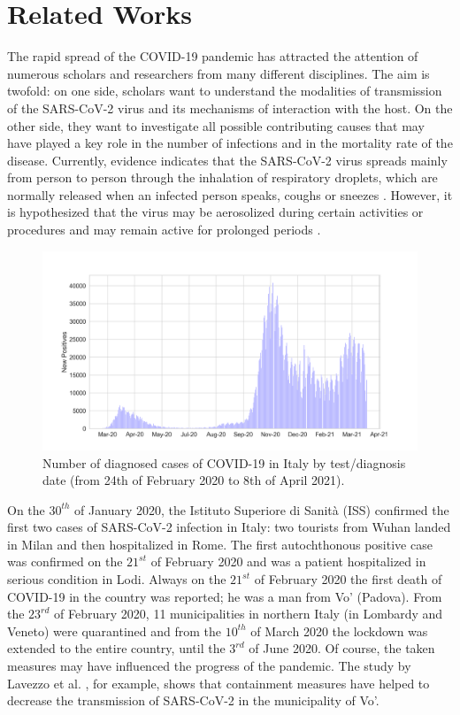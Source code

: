 \documentclass[review]{elsarticle}
\begin{document}
\section{Related Works}
The rapid spread of the COVID-19 pandemic has attracted the attention of numerous scholars and researchers from many different disciplines. The aim is twofold: on one side, scholars want to understand the modalities of transmission of the SARS-CoV-2 virus and its mechanisms of interaction with the host. On the other side, they want to investigate all possible contributing causes that may have played a key role in the number of infections and in the mortality rate of the disease. Currently, evidence indicates that the SARS-CoV-2 virus spreads mainly from person to person through the inhalation of respiratory droplets, which are normally released when an infected person speaks, coughs or sneezes \cite{la2020coronavirus}. However, it is hypothesized that the virus may be aerosolized during certain activities or procedures and may remain active for prolonged periods \cite{van2020aerosol}.
%
\begin{figure}
	\centering
	\includegraphics[width=\linewidth]{all_cases.png}
	\caption{Number of diagnosed cases of COVID-19 in Italy by test/diagnosis date (from 24th of February 2020 to 8th of April 2021).}
	\label{fig:casi_per_prelievo}
\end{figure}
%
On the $30^{th}$ of January 2020, the Istituto Superiore di Sanità (ISS) confirmed the first two cases of SARS-CoV-2 infection in Italy: two tourists from Wuhan landed in Milan and then hospitalized in Rome. The first autochthonous positive case was confirmed on the $21^{st}$ of February 2020 and was a patient hospitalized in serious condition in Lodi. Always on the $21^{st}$ of February 2020 the first death of COVID-19 in the country was reported; he was a man from Vo' (Padova). From the $23^{rd}$ of February 2020, 11 municipalities in northern Italy (in Lombardy and Veneto) were quarantined and from the $10^{th}$ of March 2020 the lockdown was extended to the entire country, until  the $3^{rd}$ of June 2020. Of course, the taken measures may have influenced the progress of the pandemic. The study by Lavezzo et al. \cite{lavezzo2020suppression}, for example, shows that containment measures have helped to decrease the transmission of SARS-CoV-2 in the municipality of Vo'.
\end{document}
